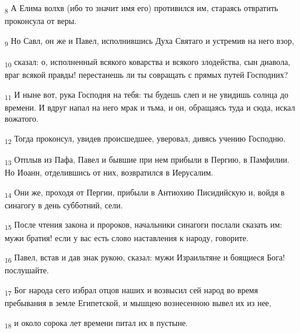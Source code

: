 \begin{tcolorbox}
\textsubscript{8} А Елима волхв (ибо то значит имя его) противился им, стараясь отвратить проконсула от веры.
\end{tcolorbox}
\begin{tcolorbox}
\textsubscript{9} Но Савл, он же и Павел, исполнившись Духа Святаго и устремив на него взор,
\end{tcolorbox}
\begin{tcolorbox}
\textsubscript{10} сказал: о, исполненный всякого коварства и всякого злодейства, сын диавола, враг всякой правды! перестанешь ли ты совращать с прямых путей Господних?
\end{tcolorbox}
\begin{tcolorbox}
\textsubscript{11} И ныне вот, рука Господня на тебя: ты будешь слеп и не увидишь солнца до времени. И вдруг напал на него мрак и тьма, и он, обращаясь туда и сюда, искал вожатого.
\end{tcolorbox}
\begin{tcolorbox}
\textsubscript{12} Тогда проконсул, увидев происшедшее, уверовал, дивясь учению Господню.
\end{tcolorbox}
\begin{tcolorbox}
\textsubscript{13} Отплыв из Пафа, Павел и бывшие при нем прибыли в Пергию, в Памфилии. Но Иоанн, отделившись от них, возвратился в Иерусалим.
\end{tcolorbox}
\begin{tcolorbox}
\textsubscript{14} Они же, проходя от Пергии, прибыли в Антиохию Писидийскую и, войдя в синагогу в день субботний, сели.
\end{tcolorbox}
\begin{tcolorbox}
\textsubscript{15} После чтения закона и пророков, начальники синагоги послали сказать им: мужи братия! если у вас есть слово наставления к народу, говорите.
\end{tcolorbox}
\begin{tcolorbox}
\textsubscript{16} Павел, встав и дав знак рукою, сказал: мужи Израильтяне и боящиеся Бога! послушайте.
\end{tcolorbox}
\begin{tcolorbox}
\textsubscript{17} Бог народа сего избрал отцов наших и возвысил сей народ во время пребывания в земле Египетской, и мышцею вознесенною вывел их из нее,
\end{tcolorbox}
\begin{tcolorbox}
\textsubscript{18} и около сорока лет времени питал их в пустыне.
\end{tcolorbox}
